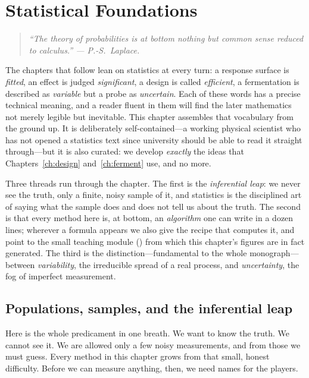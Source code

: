 \chapter{Statistical Foundations}
\label{ch:stats}

\begin{quote}\itshape
``The theory of probabilities is at bottom nothing but common sense reduced to
calculus.'' --- P.-S.~Laplace.
\end{quote}

\noindent
The chapters that follow lean on statistics at every turn: a response surface is
\emph{fitted}, an effect is judged \emph{significant}, a design is called
\emph{efficient}, a fermentation is described as \emph{variable} but a probe as
\emph{uncertain}. Each of these words has a precise technical meaning, and a
reader fluent in them will find the later mathematics not merely legible but
inevitable. This chapter assembles that vocabulary from the ground up. It is
deliberately self-contained---a working physical scientist who has not opened a
statistics text since university should be able to read it straight
through---but it is also curated: we develop \emph{exactly} the ideas that
Chapters~\ref{ch:design} and~\ref{ch:ferment} use, and no more.

Three threads run through the chapter. The first is the \emph{inferential leap}:
we never see the truth, only a finite, noisy sample of it, and statistics is the
disciplined art of saying what the sample does and does not tell us about the
truth. The second is that every method here is, at bottom, an \emph{algorithm}
one can write in a dozen lines; wherever a formula appears we also give the
recipe that computes it, and point to the small teaching module
() from which this chapter's
figures are in fact generated. The third is the distinction---fundamental to the
whole monograph---between \emph{variability}, the irreducible spread of a real
process, and \emph{uncertainty}, the fog of imperfect measurement.

\section{Populations, samples, and the inferential leap}
\label{sec:stats-pop}

Here is the whole predicament in one breath. We want to know the truth. We
cannot see it. We are allowed only a few noisy measurements, and from those we
must guess. Every method in this chapter grows from that small, honest
difficulty. Before we can measure anything, then, we need names for the players.

